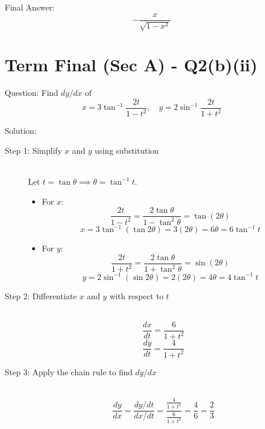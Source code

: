\documentclass[11pt, a4paper]{article}
\begin{document}
Final Answer:
\[ 
\boxed{-\frac{x}{\sqrt{1-x^2}}} 
\]



\section*{Term Final (Sec A) - Q2(b)(ii)}

Question:
Find $dy/dx$ of 
\[ x = 3\tan^{-1} \frac{2t}{1-t^2}, \quad y = 2\sin^{-1} \frac{2t}{1+t^2} \]

Solution:

\begin{description}
    \item[Step 1: Simplify $x$ and $y$ using substitution] \ \\
    Let $t = \tan \theta \implies \theta = \tan^{-1} t$.
    \begin{itemize}
        \item For $x$:
        \[ \frac{2t}{1-t^2} = \frac{2\tan\theta}{1-\tan^2\theta} = \tan(2\theta) \]
        \[ x = 3\tan^{-1}(\tan 2\theta) = 3(2\theta) = 6\theta = 6\tan^{-1} t \]

        \item For $y$:
        \[ \frac{2t}{1+t^2} = \frac{2\tan\theta}{1+\tan^2\theta} = \sin(2\theta) \]
        \[ y = 2\sin^{-1}(\sin 2\theta) = 2(2\theta) = 4\theta = 4\tan^{-1} t \]
    \end{itemize}

    \item[Step 2: Differentiate $x$ and $y$ with respect to $t$] \ \\
    \[ \frac{dx}{dt} = \frac{6}{1+t^2} \]
    \[ \frac{dy}{dt} = \frac{4}{1+t^2} \]

    \item[Step 3: Apply the chain rule to find $dy/dx$] \ \\
    \[ \frac{dy}{dx} = \frac{dy/dt}{dx/dt} = \frac{\frac{4}{1+t^2}}{\frac{6}{1+t^2}} = \frac{4}{6} = \frac{2}{3} \]
\end{description}
\end{document}

